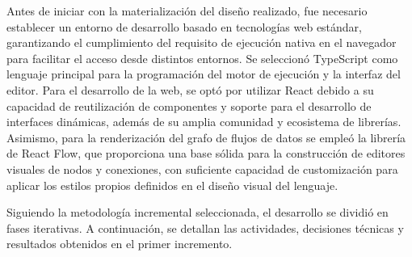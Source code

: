 
Antes de iniciar con la materialización del diseño realizado, fue necesario establecer un entorno de desarrollo basado en tecnologías web estándar, garantizando el cumplimiento del requisito de ejecución nativa en el navegador para facilitar el acceso desde distintos entornos. Se seleccionó TypeScript como lenguaje principal para la programación del motor de ejecución y la interfaz del editor. Para el desarrollo de la web, se optó por utilizar React debido a su capacidad de reutilización de componentes y soporte para el desarrollo de interfaces dinámicas, además de su amplia comunidad y ecosistema de librerías. Asimismo, para la renderización del grafo de flujos de datos se empleó la librería de React Flow, que proporciona una base sólida para la construcción de editores visuales de nodos y conexiones, con suficiente capacidad de customización para aplicar los estilos propios definidos en el diseño visual del lenguaje.

Siguiendo la metodología incremental seleccionada, el desarrollo se dividió en fases iterativas. A continuación, se detallan las actividades, decisiones técnicas y resultados obtenidos en el primer incremento.




